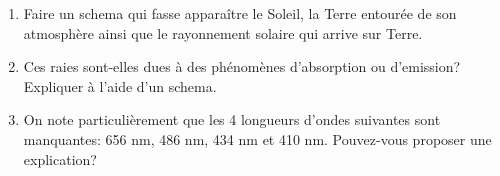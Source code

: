 \begin{enumerate}[\bf 1)]
	\item Faire un schema qui fasse apparaître le Soleil, la Terre entourée de son atmosphère
		ainsi que le rayonnement solaire qui arrive sur Terre.
	\item Ces raies sont-elles dues à des phénomènes d'absorption ou d'emission?
		Expliquer à l'aide d'un schema.
	\item On note particulièrement que les 4 longueurs d'ondes suivantes sont manquantes:
		656 nm, 486 nm, 434 nm et 410 nm. Pouvez-vous proposer une explication?

\end{enumerate}


